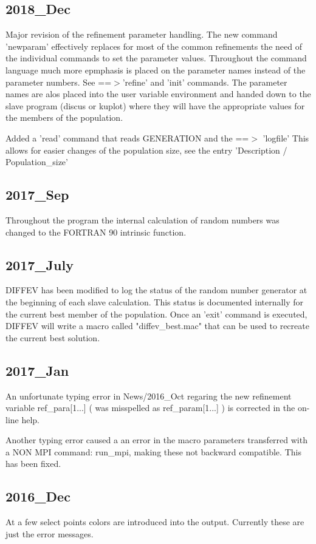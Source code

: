 \subsection*{2018\_Dec}
\par
Major revision of the refinement parameter handling. 
The new command 'newparam' effectively replaces for most of the 
common refinements the need of the individual commands to set the 
parameter values. Throughout the command language much more 
epmphasis is placed on the parameter names instead of the 
parameter numbers. See ==$> $'refine' and 'init' commands. 
The parameter names are alos placed into the user variable 
environment and handed down to the slave program (discus or kuplot) 
where they will have the appropriate values for the members of 
the population. 
\par
Added a 'read' command that reads GENERATION and the ==$> $ 'logfile' 
This allows for easier changes of the population size, see the 
entry 'Description / Population\_size' 
\subsection*{2017\_Sep}
\par
Throughout the program the internal calculation of random numbers 
was changed to the FORTRAN 90 intrinsic function. 
\subsection*{2017\_July}
DIFFEV has been modified to log the status of the random number generator 
at the beginning of each slave calculation. This status is documented 
internally for the current best member of the population. Once an 'exit' 
command is executed, DIFFEV will write a macro called "diffev\_best.mac" 
that can be used to recreate the current best solution. 
\subsection*{2017\_Jan}
An unfortunate typing error in News/2016\_Oct regaring the new 
refinement variable 
ref\_para[1...]   ( was misspelled as ref\_param[1...] ) 
is corrected in the  on-line help. 
\par
Another typing error caused a an error in the macro parameters 
transferred with a NON MPI command: run\_mpi, making these 
not backward compatible. This has been fixed. 
\subsection*{2016\_Dec}
\par
At a few select points colors are introduced into the output. 
Currently these are just the error messages. 
\par
